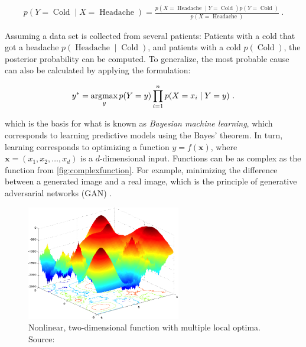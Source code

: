 
\begin{align}
p(Y=\operatorname{Cold} \mid X=\operatorname{Headache}) = \frac{p(X=\operatorname{Headache} \mid Y=\operatorname{Cold}) p(Y=\operatorname{Cold})}{p(X=\operatorname{Headache})}~.
\end{align}

Assuming a data set is collected from several patients: Patients with a cold that got a headache $p(\operatorname{Headache} \mid \operatorname{Cold})$, and patients with a cold $p(\operatorname{Cold})$, the posterior probability can be computed. To generalize, the most probable cause can also be calculated by applying the formulation:

\begin{align}
y^* = \operatorname*{argmax}_{y} p(Y=y)\prod_{i=1}^n p(X=x_i\mid Y=y)~.
\end{align}

which is the basis for what is known as \textit{Bayesian machine learning}, which corresponds to learning predictive models using the Bayes' theorem. In turn, learning corresponds to optimizing a function $y = f(\mathbf{x})$, where $\mathbf{x} = (x_1, x_2, \ldots, x_d)$ is a $d$-dimensional input. Functions can be as complex as the function from \autoref{fig:complexfunction}. For example, minimizing the difference between a generated image and a real image, which is the principle of generative adversarial networks (GAN) \parencite{gonog2019review}.

\begin{figure}[h]
    \centering
    \includegraphics[width=0.6\textwidth]{figures/complexfunction.png}
    \caption{Nonlinear, two-dimensional function with multiple local optima. Source: \parencite{li2013benchmark}}
    \label{fig:complexfunction}
\end{figure}

